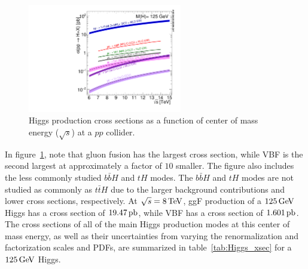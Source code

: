 \begin{figure}[h!]
  \centering
  \captionsetup{justification=centering}

  \includegraphics[width=0.6\textwidth,angle=270]{figures/h125_xsec}
  \caption{Higgs production cross sections as a function of center of mass energy ($\sqrt{s}$) at a $pp$ collider\cite{LHCXSWG}.}
  \label{fig:Higgs_xsec}
\end{figure}

In figure~\ref{fig:Higgs_xsec}, note that gluon fusion has the largest cross section, while VBF is the second largest at approximately a factor of $10$ smaller. The figure also includes the less commonly studied $b\bar{b}H$ and $tH$ modes. The $b\bar{b}H$ and $tH$ modes are not studied as commonly as $t\bar{t}H$ due to the larger background contributions and lower cross sections, respectively. At $\sqrt{s} = 8 \TeV$, ggF production of a $125 \GeV$ Higgs has a cross section of $19.47 \mbox{\,pb}$, while VBF has a cross section of $1.601 \mbox{\,pb}$\cite{LHCXSWG}. The cross sections of all of the main Higgs production modes at this center of mass energy, as well as their uncertainties from varying the renormalization and factorization scales and PDFs, are summarized in table~\ref{tab:Higgs_xsec} for a $125 \GeV$ Higgs.

